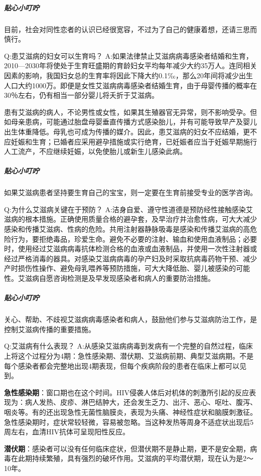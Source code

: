 \documentclass[12pt,UTF8]{ctexbook}
\begin{document}
\subparagraph{贴心小叮咛}

目前，社会对同性恋者的认识已经很宽容，不过为了自己的健康着想，还请三思而慎行。

Q:患艾滋病的妇女可以生育吗？
A:如果法律禁止艾滋病病毒感染者结婚和生育，2010—2030年将使处于生育旺盛期的育龄妇女平均每年减少大约35万人。连同相关因素的影响，我国妇女总的生育率将因此下降大约0.1‰，那么20年间将减少出生人口大约1000万。即便是女性艾滋病病毒感染者结婚生育，由于母婴传播的概率在30％左右，仍有相当一部分婴儿将夭折于艾滋病。

患有艾滋病的病人，不论男性或女性，如果其生殖器官无异常，则不影响受孕。但如母亲患病，可能通过胎盘母婴垂直传播方式感染胎儿，并有可能导致早产及婴儿出生体重降低。母乳也可成为传播的媒介。因此，患艾滋病的妇女不应结婚，更不应妊娠和生育；已婚者应采用避孕措施或实行绝育，已妊娠者应当于妊娠早期施行人工流产，不应继续妊娠，以免使胎儿或新生儿感染此病。

\subparagraph{贴心小叮咛}

如果艾滋病患者坚持要生育自己的宝宝，则一定要在生育前接受专业的医学咨询。

Q:为什么艾滋病关键在于预防？
A:洁身自爱、遵守性道德是预防经性接触感染艾滋病的根本措施。正确使用质量合格的避孕套，及早治疗并治愈性病，可大大减少感染和传播艾滋病、性病的危险。共用注射器静脉吸毒是感染和传播艾滋病的高危险行为，要拒绝毒品，珍爱生命。避免不必要的注射、输血和使用血液制品；必要时，使用经过艾滋病病毒抗体检测合格的血液或血液制品，并使用一次性注射器或经过严格消毒的器具。对感染艾滋病病毒的孕产妇及时采取抗病毒药物干预、减少产时损伤性操作、避免母乳喂养等预防措施，可大大降低胎、婴儿被感染的可能性。艾滋病自愿咨询检测是及早发现感染者和病人的重要防治措施。

\subparagraph{贴心小叮咛}

关心、帮助、不歧视艾滋病病毒感染者和病人，鼓励他们参与艾滋病防治工作，是控制艾滋病传播的重要措施。

Q:艾滋病有什么表现？
A:从感染艾滋病病毒到发病有一个完整的自然过程，临床上将这个过程分为4期：急性感染期、潜伏期、艾滋病前期、典型艾滋病期。不是每个感染者都会完整地出现4期表现，但每个疾病阶段的患者在临床上都可以见到。

\textbf{急性感染期}：窗口期也在这个时间。HIV侵袭人体后对机体的刺激所引起的反应表现为：病人发热、皮疹、淋巴结肿大，还会发生乏力、出汗、恶心、呕吐、腹泻、咽炎等。有的还出现急性无菌性脑膜炎，表现为头痛、神经性症状和脑膜刺激征。急性感染期时，症状常较轻微，容易被忽略。当这种发热等周身不适症状出现后5周左右，血清HIV抗体可呈现阳性反应。

\textbf{潜伏期}：感染者可以没有任何临床症状，但潜伏期不是静止期，更不是安全期，病毒在此期持续繁殖，具有强烈的破坏作用。艾滋病的平均潜伏期，现在认为是2～10年。
\end{document}
